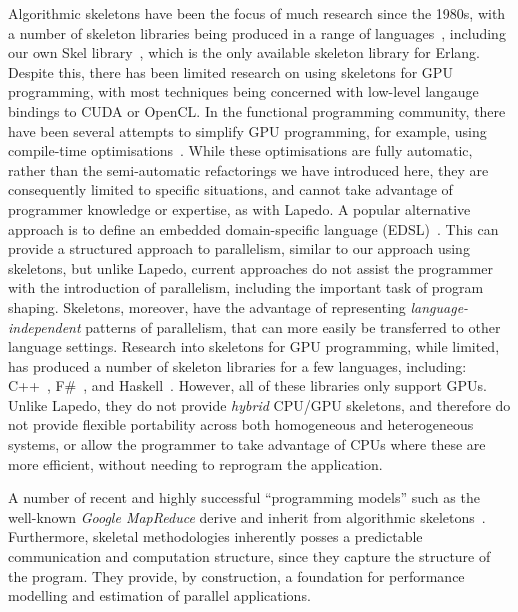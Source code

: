 \documentclass[final]{jfp1}
\newcommand{\lapedo}{\xspace{\sc Lapedo}\xspace}
\newcommand{\Lapedo}{\lapedo}
\begin{document}

Algorithmic skeletons have been the focus of much research since the
1980s, with a number of skeleton libraries being produced in a range of
languages~\cite{Gonzalez-Velez:2010:SAS}, including our own Skel
library~\cite{hlpp}, which is the only available skeleton library for
Erlang. Despite this, there has been limited research on using skeletons
for GPU programming, with most techniques being concerned with low-level
langauge bindings to CUDA or OpenCL. In the functional programming
community, there have been several attempts to simplify GPU programming,
for example, using compile-time
optimisations~\cite{Guo:2011:BGP,McDonell:2013:OPF}. While these
optimisations are fully automatic, rather than the semi-automatic
refactorings we have introduced here, they are consequently limited to
specific situations, and cannot take advantage of programmer knowledge or
expertise, as with \Lapedo{}.  A popular alternative approach is to
define an embedded domain-specific language
(EDSL)~\cite{Lee:2011:IDS,Claessen:2012:EAC,Grossman:2011:DPG}.  This can
provide a structured approach to parallelism, similar to our approach
using skeletons, but unlike \Lapedo{}, current approaches do not assist
the programmer with the introduction of parallelism, including the
important task of program shaping.  Skeletons, moreover, have the
advantage of representing \emph{language-independent} patterns of
parallelism, that can more easily be transferred to other language
settings.
Research into skeletons for GPU programming, while
limited, has produced a number of skeleton libraries for a few languages,
including: C++~\cite{Tung:2012:ILM}, F\#~\cite{Singh:2010:DDP}, and
Haskell~\cite{Chakravarty:2011:AHA}. However, all of these libraries only support GPUs.
Unlike Lapedo, they do not provide \emph{hybrid} CPU/GPU skeletons, and
therefore do not provide flexible portability across both homogeneous and heterogeneous systems,
or allow the programmer to take advantage of CPUs where these are more efficient,
without needing to reprogram the application.

A number of recent
and highly successful ``programming models'' such as the
 well-known \textit{Google MapReduce} derive and inherit from
 algorithmic skeletons~\cite{mapreduce}.
Furthermore, skeletal methodologies inherently posses a
 predictable communication and computation structure, since they
 capture the structure of the program. They provide, by
 construction, a foundation for performance modelling and
 estimation of parallel applications.
\end{document}
